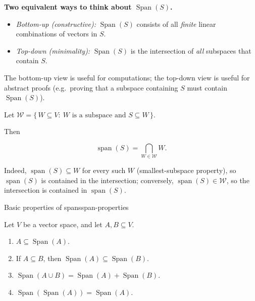 \begin{policynote}
\textbf{Two equivalent ways to think about $\operatorname{Span}(S)$.}
\begin{itemize}[leftmargin=*]
\item \emph{Bottom-up (constructive):} $\operatorname{Span}(S)$ consists of all \emph{finite} linear combinations of vectors in $S$.
\item \emph{Top-down (minimality):} $\operatorname{Span}(S)$ is the intersection of \emph{all} subspaces that contain $S$.
\end{itemize}
The bottom-up view is useful for computations; the top-down view is useful for abstract proofs (e.g.\ proving that a subspace containing $S$ must contain $\operatorname{Span}(S)$).
\end{policynote}

\begin{extension}[title={Extension (Lecture Week 2: Span as an intersection)}]

Let $\mathcal{W}=\{\,W\subseteq V:\ W\text{ is a subspace and }S\subseteq W\,\}$.

Then

\[
\operatorname{span}(S)=\bigcap_{W\in\mathcal{W}} W.
\]

Indeed, $\operatorname{span}(S)\subseteq W$ for every such $W$ (smallest-subspace property), so $\operatorname{span}(S)$ is contained in the intersection; conversely, $\operatorname{span}(S)\in\mathcal{W}$, so the intersection is contained in $\operatorname{span}(S)$.

\end{extension}

\begin{theorem}{Basic properties of spans}{span-properties}

Let $V$ be a vector space, and let $A,B\subseteq V$.

\begin{enumerate}[label=(\alph*), leftmargin=*]

\item $A\subseteq \operatorname{Span}(A)$.

\item If $A\subseteq B$, then $\operatorname{Span}(A)\subseteq \operatorname{Span}(B)$.

\item $\operatorname{Span}(A\cup B)=\operatorname{Span}(A)+\operatorname{Span}(B)$.

\item $\operatorname{Span}(\operatorname{Span}(A))=\operatorname{Span}(A)$.

\end{enumerate}

\end{theorem}


